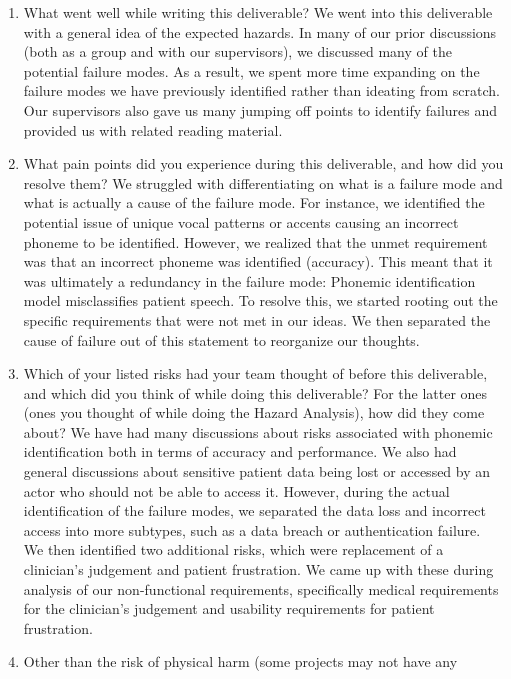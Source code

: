 \documentclass{article}
\begin{document}
\begin{enumerate}
    \item What went well while writing this deliverable?
    We went into this deliverable with a general idea of the expected hazards.
    In many of our prior discussions (both as a group and with our supervisors), we discussed many of the potential failure modes.
    As a result, we spent more time expanding on the failure modes we have previously identified rather than ideating from scratch.
    Our supervisors also gave us many jumping off points to identify failures and provided us with related reading material.
    \item What pain points did you experience during this deliverable, and how
    did you resolve them?
    We struggled with differentiating on what is a failure mode and what is actually a cause of the failure mode.
    For instance, we identified the potential issue of unique vocal patterns or accents causing an incorrect phoneme to be identified.
    However, we realized that the unmet requirement was that an incorrect phoneme was identified (accuracy).
    This meant that it was ultimately a redundancy in the failure mode: Phonemic identification model misclassifies patient speech.
    To resolve this, we started rooting out the specific requirements that were not met in our ideas.
    We then separated the cause of failure out of this statement to reorganize our thoughts.
    \item Which of your listed risks had your team thought of before this
    deliverable, and which did you think of while doing this deliverable? For
    the latter ones (ones you thought of while doing the Hazard Analysis), how
    did they come about?
    We have had many discussions about risks associated with phonemic identification both in terms of accuracy and performance.
    We also had general discussions about sensitive patient data being lost or accessed by an actor who should not be able to access it.
    However, during the actual identification of the failure modes, we separated the data loss and incorrect access into more subtypes, such as a data breach or authentication failure.
    We then identified two additional risks, which were replacement of a clinician's judgement and patient frustration.
    We came up with these during analysis of our non-functional requirements, specifically medical requirements for the clinician's judgement and usability requirements for patient frustration.
    \item Other than the risk of physical harm (some projects may not have any

\end{enumerate}
\end{document}
